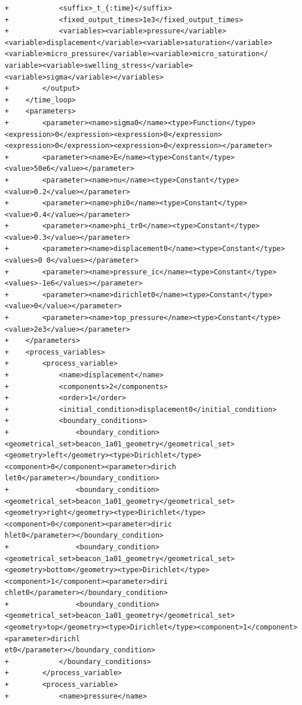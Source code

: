 \documentclass[10pt]{article}
\begin{document}
\begin{lstlisting}
+            <suffix>_t_{:time}</suffix>
+            <fixed_output_times>1e3</fixed_output_times>
+            <variables><variable>pressure</variable><variable>displacement</variable><variable>saturation</variable><variable>micro_pressure</variable><variable>micro_saturation</
variable><variable>swelling_stress</variable><variable>sigma</variable></variables>
+        </output>
+    </time_loop>
+    <parameters>
+        <parameter><name>sigma0</name><type>Function</type><expression>0</expression><expression>0</expression><expression>0</expression><expression>0</expression></parameter>
+        <parameter><name>E</name><type>Constant</type><value>50e6</value></parameter>
+        <parameter><name>nu</name><type>Constant</type><value>0.2</value></parameter>
+        <parameter><name>phi0</name><type>Constant</type><value>0.4</value></parameter>
+        <parameter><name>phi_tr0</name><type>Constant</type><value>0.3</value></parameter>
+        <parameter><name>displacement0</name><type>Constant</type><values>0 0</values></parameter>
+        <parameter><name>pressure_ic</name><type>Constant</type><values>-1e6</values></parameter>
+        <parameter><name>dirichlet0</name><type>Constant</type><value>0</value></parameter>
+        <parameter><name>top_pressure</name><type>Constant</type><value>2e3</value></parameter>
+    </parameters>
+    <process_variables>
+        <process_variable>
+            <name>displacement</name>
+            <components>2</components>
+            <order>1</order>
+            <initial_condition>displacement0</initial_condition>
+            <boundary_conditions>
+                <boundary_condition><geometrical_set>beacon_1a01_geometry</geometrical_set><geometry>left</geometry><type>Dirichlet</type><component>0</component><parameter>dirich
let0</parameter></boundary_condition>
+                <boundary_condition><geometrical_set>beacon_1a01_geometry</geometrical_set><geometry>right</geometry><type>Dirichlet</type><component>0</component><parameter>diric
hlet0</parameter></boundary_condition>
+                <boundary_condition><geometrical_set>beacon_1a01_geometry</geometrical_set><geometry>bottom</geometry><type>Dirichlet</type><component>1</component><parameter>diri
chlet0</parameter></boundary_condition>
+                <boundary_condition><geometrical_set>beacon_1a01_geometry</geometrical_set><geometry>top</geometry><type>Dirichlet</type><component>1</component><parameter>dirichl
et0</parameter></boundary_condition>
+            </boundary_conditions>
+        </process_variable>
+        <process_variable>
+            <name>pressure</name>

\end{lstlisting}
\end{document}
